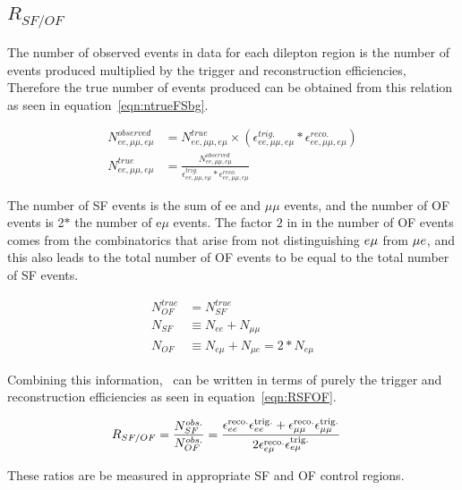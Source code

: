 \subsection{\texorpdfstring{$R_{SF/OF}$}{Rsfof}}
The number of observed events in data for each dilepton region is the number of events produced multiplied by the trigger and reconstruction efficiencies,
Therefore the true number of events produced can be obtained from this relation as seen in equation~\ref{eqn:ntrueFSbg}.

\begin{align}
  N_{ee, \mu\mu, e\mu }^{observed} & = N_{ee, \mu\mu, e\mu }^{true} \times (\epsilon_{ee, \mu\mu, e\mu }^{trig.} * \epsilon_{ee, \mu\mu, e\mu }^{reco.})\\
  \label{eqn:ntrueFSbg} N_{ee, \mu\mu, e\mu }^{true} & = \frac{N_{ee, \mu\mu, e\mu }^{observed}}{\epsilon_{ee, \mu\mu, e\mu }^{trig.} * \epsilon_{ee, \mu\mu, e\mu }^{reco.}}
\end{align}

The number of SF events is the sum of ee and $\mu\mu$ events, and the number of OF events is 2$*$ the number of e$\mu$ events.
The factor $2$ in in the number of OF events comes from the combinatorics that arise from not distinguishing $\relax{e}\mu$ from $\mu\relax{e}$,
and this also leads to the total number of OF events to be equal to the total number of SF events.

\begin{align}
  \label{eqn:noftrueFSbg} N_{OF}^{true} & = N_{SF}^{true}\\  
  N_{SF} & \equiv N_{ee} + N_{\mu\mu}\\ 
  N_{OF} & \equiv N_{e\mu}+N_{\mu e} = 2 * N_{e\mu}
\end{align}

Combining this information, \rsfof\ can be written in terms of purely the trigger and reconstruction efficiencies as seen in equation~\ref{eqn:RSFOF}.

\begin{align}
  \label{eqn:RSFOF} R_{SF/OF}     & = \frac{N_{SF}^{obs.}}{N_{OF}^{obs.}}
  = \frac{\epsilon_{\relax{e}\relax{e}}^\mathrm{reco.}\epsilon_{\relax{e}\relax{e}}^\mathrm{trig.} + \epsilon_{\mu\mu}^\mathrm{reco.}\epsilon_{\mu\mu}^\mathrm{trig.}}{2\epsilon_{e\mu}^\mathrm{reco.}\epsilon_{e\mu}^\mathrm{trig.}}
\end{align}

These ratios are be measured in appropriate SF and OF control regions.

\clearpage

